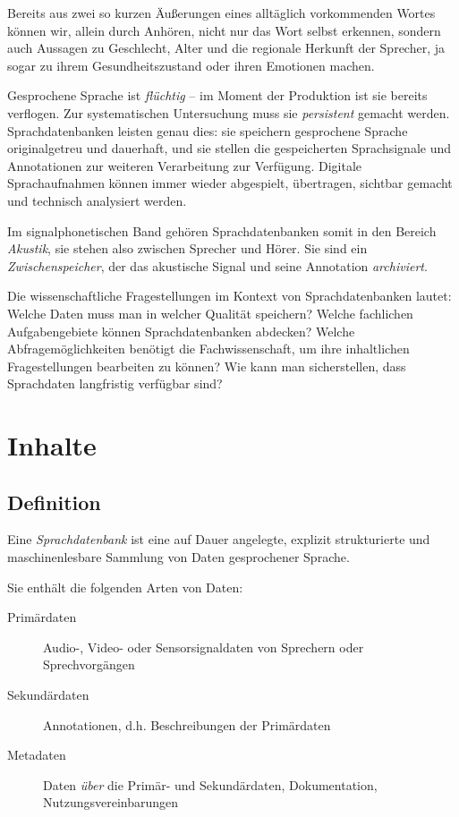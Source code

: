 \documentclass[11pt]{book}
\begin{document}
Bereits aus zwei so kurzen Äußerungen eines alltäglich vorkommenden Wortes können wir, allein durch Anhören, nicht nur das Wort selbst erkennen, sondern auch Aussagen zu Geschlecht, Alter und die regionale Herkunft der Sprecher, ja sogar zu ihrem Gesundheitszustand oder ihren Emotionen machen. 

Gesprochene Sprache ist {\em flüchtig} -- im Moment der Produktion ist sie bereits verflogen. Zur systematischen Untersuchung muss sie {\em persistent} gemacht werden. Sprachdatenbanken leisten genau dies: sie speichern gesprochene Sprache originalgetreu und dauerhaft, und sie stellen die gespeicherten Sprachsignale und Annotationen zur weiteren Verarbeitung zur Verfügung. Digitale Sprachaufnahmen können immer wieder abgespielt, übertragen, sichtbar gemacht und technisch analysiert werden. 

Im signalphonetischen Band gehören Sprachdatenbanken somit in den Bereich {\em Akustik}, sie stehen also zwischen Sprecher und Hörer. Sie sind ein {\em Zwischenspeicher}, der das akustische Signal und seine Annotation {\em archiviert}.

Die wissenschaftliche Fragestellungen im Kontext von Sprachdatenbanken lautet: Welche Daten muss man in welcher Qualität speichern? Welche fachlichen Aufgabengebiete können Sprachdatenbanken abdecken? Welche Abfragemöglichkeiten benötigt die Fachwissenschaft, um ihre inhaltlichen Fragestellungen bearbeiten zu können? Wie kann man sicherstellen, dass Sprachdaten langfristig verfügbar sind?

\section{Inhalte}

\subsection*{Definition} 
Eine {\em Sprachdatenbank} ist eine auf Dauer angelegte, explizit strukturierte und maschinenlesbare Sammlung von Daten gesprochener Sprache. 

Sie enthält die folgenden Arten von Daten:
\begin{description}
\item[Primärdaten]{Audio-, Video- oder Sensorsignaldaten von Sprechern oder Sprechvorgängen}
\item[Sekundärdaten]{Annotationen, d.h. Beschreibungen der Primärdaten}
\item[Metadaten]{Daten {\em über} die Primär- und Sekundärdaten, Dokumentation, Nutzungsvereinbarungen}
\end{description}
\end{document}
